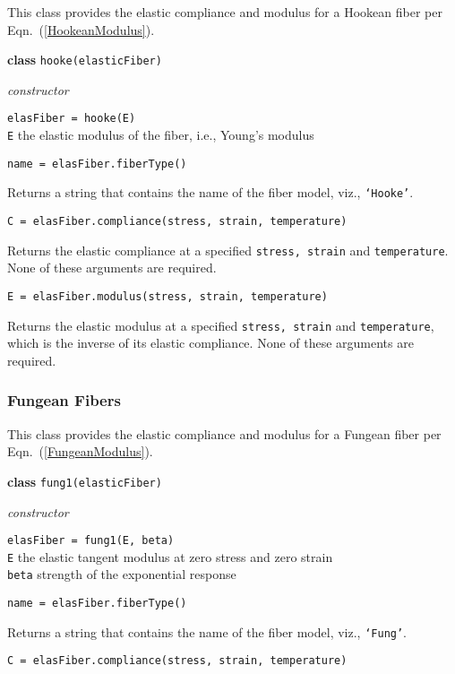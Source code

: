 This class provides the elastic compliance and modulus for a Hookean fiber per Eqn.~(\ref{HookeanModulus}).

\bigskip\noindent
\textbf{class} \texttt{hooke(elasticFiber)}

\medskip\noindent
\textit{constructor}

\medskip\noindent
\texttt{elasFiber = hooke(E)} \\
\indent \texttt{E} \;\; the elastic modulus of the fiber, i.e., Young's modulus

\bigskip\noindent
\texttt{name = elasFiber.fiberType()}

\medskip\noindent
Returns a string that contains the name of the fiber model, viz., \texttt{`Hooke'}.

\medskip\noindent
\texttt{C = elasFiber.compliance(stress, strain, temperature)}

\medskip\noindent
Returns the elastic compliance at a specified \texttt{stress, strain} and \texttt{temperature}.  None of these arguments are required.

\medskip\noindent
\texttt{E = elasFiber.modulus(stress, strain, temperature)}

\medskip\noindent
Returns the elastic modulus at a specified \texttt{stress, strain} and \texttt{temperature}, which is the inverse of its elastic compliance.  None of these arguments are required.


\subsubsection{Fungean Fibers}

This class provides the elastic compliance and modulus for a Fungean fiber per Eqn.~(\ref{FungeanModulus}).

\bigskip\noindent
\textbf{class} \texttt{fung1(elasticFiber)}

\medskip\noindent
\textit{constructor}

\medskip\noindent
\texttt{elasFiber = fung1(E, beta)} \\
\indent \texttt{E} \qquad the elastic tangent modulus at zero stress and zero strain \\
\indent \texttt{beta} \: strength of the exponential response

\bigskip\noindent
\texttt{name = elasFiber.fiberType()}

\medskip\noindent
Returns a string that contains the name of the fiber model, viz., \texttt{`Fung'}.

\medskip\noindent
\texttt{C = elasFiber.compliance(stress, strain, temperature)}

